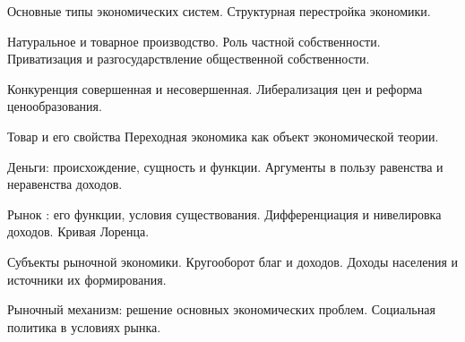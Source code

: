 \documentclass[
	14pt,
	a4paper,
	]
	{scrartcl}
\begin{document}
\vfill
\z 	Основные типы экономических систем. 
 \vfill
\z 	Структурная перестройка экономики.
 \vfill

\vfill

\newpage


\shapk
{}
\setcounter{zad}{0}

\vfill
\z 	Натуральное и товарное производство. Роль частной собственности.
 \vfill
\z 	Приватизация и разгосударствление общественной собственности.
 \vfill

\vfill

\newpage


\shapk
{}
\setcounter{zad}{0}

\vfill
\z 	Конкуренция совершенная и несовершенная.
 \vfill
\z 	Либерализация цен и реформа ценообразования.
 \vfill

\vfill

\newpage


\shapk
{}
\setcounter{zad}{0}

\vfill
\z 	Товар и его свойства
 \vfill
\z 	Переходная экономика как объект экономической теории.
 \vfill

\vfill

\newpage


\shapk
{}
\setcounter{zad}{0}

\vfill
\z 	Деньги: происхождение, сущность и функции.
 \vfill
\z 	Аргументы в пользу равенства и неравенства доходов.
 \vfill

\vfill

\newpage


\shapk
{}
\setcounter{zad}{0}

\vfill
\z 	Рынок : его функции, условия существования.
 \vfill
\z 	Дифференциация и нивелировка доходов.  Кривая Лоренца.
 \vfill

\vfill

\newpage


\shapk
{}
\setcounter{zad}{0}

\vfill
\z 	Субъекты рыночной экономики.  Кругооборот благ и доходов.
 \vfill
\z 	Доходы населения и источники их  формирования.
 \vfill

\vfill

\newpage


\shapk
{}
\setcounter{zad}{0}

\vfill
\z 	Рыночный механизм: решение основных экономических проблем.
 \vfill
\z 	Социальная политика в условиях рынка.
 \vfill
\end{document}

